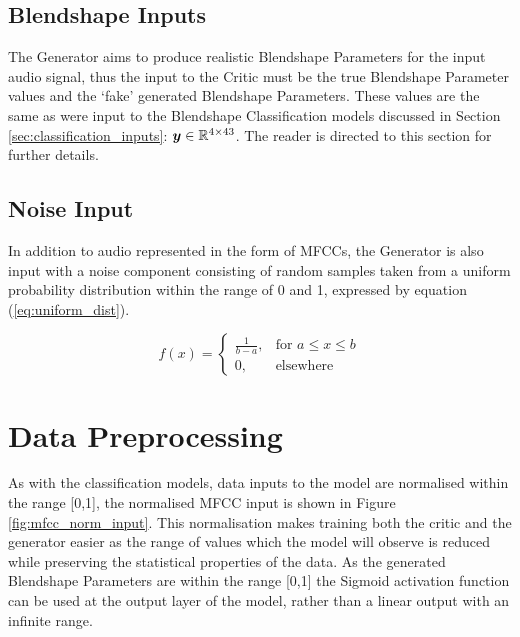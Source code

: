 \subsection{Blendshape Inputs}
The Generator aims to produce realistic Blendshape Parameters for the input audio signal, thus the input to the Critic must be the true Blendshape Parameter values and the `fake' generated Blendshape Parameters.
These values are the same as were input to the Blendshape Classification models discussed in Section \ref{sec:classification_inputs}: ${\boldsymbol{{y}}} \in \mathbb{R}^{4 \times 43}$.
The reader is directed to this section for further details.

\subsection{Noise Input}
In addition to audio represented in the form of MFCCs, the Generator is also input with a noise component consisting of random samples taken from a uniform probability distribution within the range of 0 and 1, expressed by equation (\ref{eq:uniform_dist}).

\begin{equation}\label{eq:uniform_dist}
    f(x)=\begin{cases}
      \frac{1}{b-a}, & \text{for $a \leq x \leq b$}\\
      0, & \text{elsewhere}
    \end{cases}
\end{equation}

\section{Data Preprocessing}
As with the classification models, data inputs to the model are normalised within the range [0,1], the normalised MFCC input is shown in Figure \ref{fig:mfcc_norm_input}.
This normalisation makes training both the critic and the generator easier as the range of values which the model will observe is reduced while preserving the statistical properties of the data.
As the generated Blendshape Parameters are within the range [0,1] the Sigmoid activation function can be used at the output layer of the model, rather than a linear output with an infinite range.

